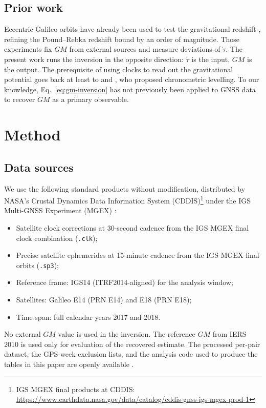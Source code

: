 \documentclass[11pt,a4paper]{article}
\begin{document}
\subsection{Prior work}

Eccentric Galileo orbits have already been used to test the gravitational redshift \citep{Delva2018, Herrmann2018}, refining the Pound--Rebka redshift bound by an order of magnitude. Those experiments fix $GM$ from external sources and measure deviations of $\dot\tau$. The present work runs the inversion in the opposite direction: $\dot\tau$ is the input, $GM$ is the output. The prerequisite of using clocks to read out the gravitational potential goes back at least to \citet{Bjerhammar1975} and \citet{Vermeer1983}, who proposed chronometric levelling. To our knowledge, Eq.~\eqref{eq:gm-inversion} has not previously been applied to GNSS data to recover $GM$ as a primary observable.

\section{Method}

\subsection{Data sources}

We use the following standard products without modification, distributed by NASA's Crustal Dynamics Data Information System (CDDIS)\footnote{IGS MGEX final products at CDDIS: \url{https://www.earthdata.nasa.gov/data/catalog/cddis-gnss-igs-mgex-prod-1}} under the IGS Multi-GNSS Experiment (MGEX) \citep{CDDIS_MGEX, Noll2010}:
\begin{itemize}
    \item Satellite clock corrections at 30-second cadence from the IGS MGEX final clock combination (\texttt{.clk});
    \item Precise satellite ephemerides at 15-minute cadence from the IGS MGEX final orbits (\texttt{.sp3});
    \item Reference frame: IGS14 (ITRF2014-aligned) for the analysis window;
    \item Satellites: Galileo E14 (PRN E14) and E18 (PRN E18);
    \item Time span: full calendar years 2017 and 2018.
\end{itemize}
No external $GM$ value is used in the inversion. The reference $GM$ from IERS 2010 is used only for evaluation of the recovered estimate. The processed per-pair dataset, the GPS-week exclusion lists, and the analysis code used to produce the tables in this paper are openly available \citep{HansenData2026, HansenCode2026}.
\end{document}
